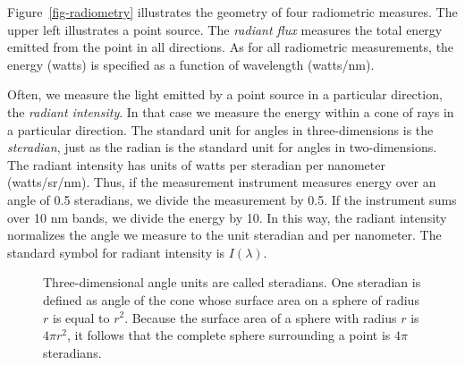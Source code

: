\documentclass[
  letterpaper,
]{book}
\begin{document}
Figure~\ref{fig-radiometry} illustrates the geometry of four radiometric
measures. The upper left illustrates a point source. The \emph{radiant
flux} measures the total energy emitted from the point in all
directions. As for all radiometric measurements, the energy (watts) is
specified as a function of wavelength (watts/nm).

Often, we measure the light emitted by a point source in a particular
direction, the \emph{radiant intensity}. In that case we measure the
energy within a cone of rays in a particular direction. The standard
unit for angles in three-dimensions is the \emph{steradian}, just as the
radian is the standard unit for angles in two-dimensions. The radiant
intensity has units of watts per steradian per nanometer (watts/sr/nm).
Thus, if the measurement instrument measures energy over an angle of 0.5
steradians, we divide the measurement by 0.5. If the instrument sums
over 10 nm bands, we divide the energy by 10. In this way, the radiant
intensity normalizes the angle we measure to the unit steradian and per
nanometer. The standard symbol for radiant intensity is \(I(\lambda)\).

\begin{tcolorbox}[enhanced jigsaw, colframe=quarto-callout-note-color-frame, titlerule=0mm, rightrule=.15mm, opacitybacktitle=0.6, colback=white, leftrule=.75mm, coltitle=black, title=\textcolor{quarto-callout-note-color}{\faInfo}\hspace{0.5em}{Steradians}, bottomrule=.15mm, colbacktitle=quarto-callout-note-color!10!white, breakable, left=2mm, bottomtitle=1mm, toptitle=1mm, opacityback=0, arc=.35mm, toprule=.15mm]

\begin{figure}[H]


\caption{\label{fig-steradian}Three-dimensional angle units are called
steradians. One steradian is defined as angle of the cone whose surface
area on a sphere of radius \(r\) is equal to \(r^2\). Because the
surface area of a sphere with radius \(r\) is \(4 \pi r^2\), it follows
that the complete sphere surrounding a point is \(4 \pi\) steradians.}

\end{figure}%

\end{tcolorbox}
\end{document}
